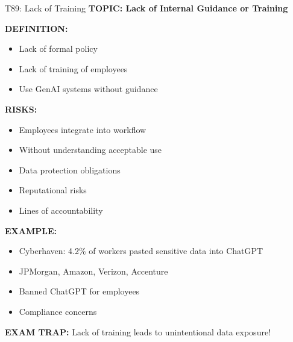\documentclass[8pt]{beamer}
\begin{document}
	\begin{frame}{T89: Lack of Training}
		\fontsize{6.5}{7.5}\selectfont
		\textbf{TOPIC: Lack of Internal Guidance or Training}
		
		\vspace{0.1cm}
		\textbf{DEFINITION:}
		\begin{itemize}
			\item Lack of formal policy
			\item Lack of training of employees
			\item Use GenAI systems without guidance
		\end{itemize}
		
		\vspace{0.1cm}
		\textbf{RISKS:}
		\begin{itemize}
			\item Employees integrate into workflow
			\item Without understanding acceptable use
			\item Data protection obligations
			\item Reputational risks
			\item Lines of accountability
		\end{itemize}
		
		\vspace{0.1cm}
		\textbf{EXAMPLE:}
		\begin{itemize}
			\item Cyberhaven: 4.2\% of workers pasted sensitive data into ChatGPT
			\item JPMorgan, Amazon, Verizon, Accenture
			\item Banned ChatGPT for employees
			\item Compliance concerns
		\end{itemize}
		
		\textcolor{myred}{\textbf{EXAM TRAP:}} Lack of training leads to \textcolor{myblue}{unintentional data exposure}!
	\end{frame}
	
\end{document}

